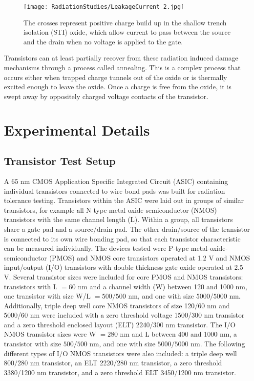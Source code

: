 \begin{figure}[htbp]
\begin{center}
\texttt{[image: RadiationStudies/LeakageCurrent\_2.jpg]}
\end{center}
\caption{The crosses represent positive charge build up in the shallow trench isolation (STI) oxide, which allow current to pass between the source and the drain when no voltage is applied to the gate\cite{LeakageCurrent}.}
\label{fig:LeakageCurrent}
\end{figure}

Transistors can at least partially recover from these radiation induced damage mechanisms through a process called annealing. This is a complex process that occurs either when trapped charge tunnels out of the oxide or is thermally excited enough to leave the oxide. Once a charge is free from the oxide, it is swept away by oppositely charged voltage contacts of the transistor. 

\section{Experimental Details}

\subsection{Transistor Test Setup}

A 65 nm CMOS Application Specific Integrated Circuit (ASIC) containing individual transistors connected to wire bond pads was built for radiation tolerance testing. Transistors within the ASIC were laid out in groups of similar transistors, for example all N-type metal-oxide-semiconductor (NMOS) transistors with the same channel length (L). Within a group, all transistors share a gate pad and a source/drain pad. The other drain/source of the transistor is connected to its own wire bonding pad, so that each transistor characteristic can be measured individually. The devices tested were P-type metal-oxide-semiconductor (PMOS) and NMOS core transistors operated at 1.2 V and NMOS input/output (I/O) transistors with double thickness gate oxide operated at 2.5 V. Several transistor sizes were included for core PMOS and NMOS transistors: transistors with L $=60$ nm and a channel width (W) between 120 and 1000 nm, one transistor with size W/L $=500/500$ nm, and one with size $5000/5000$ nm. Additionally, triple deep well core NMOS transistors of size 120/60 nm and 5000/60 nm were included with a zero threshold voltage 1500/300 nm transistor and a zero threshold enclosed layout (ELT) 2240/300 nm transistor. The I/O NMOS transistor sizes were W $=280$ nm and L between 400 and 1000 nm, a transistor with size $500/500$ nm, and one with size $5000/5000$ nm. The following different types of I/O NMOS transistors were also included: a triple deep well 800/280 nm transistor, an ELT 2220/280 nm transistor, a zero threshold 3380/1200 nm transistor, and a zero threshold ELT 3450/1200 nm transistor.

